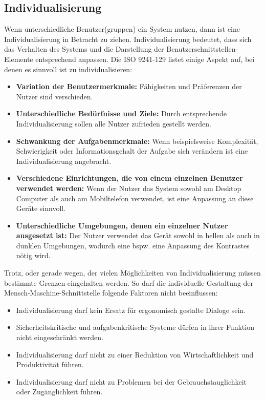 \subsection{Individualisierung}
\label{2:Individualisierung}
Wenn unterschiedliche Benutzer(gruppen) ein System nutzen, dann ist eine Individualisierung in Betracht zu ziehen. Individualisierung bedeutet, dass sich das Verhalten des Systems und die Darstellung der Benutzerschnittstellen-Elemente entsprechend anpassen. Die ISO 9241-129 \cite{ISO9241-129} listet einige Aspekt auf, bei denen es sinnvoll ist zu individualisieren:
\begin{itemize}
\item \textbf{Variation der Benutzermerkmale:} Fähigkeiten und Präferenzen der Nutzer sind verschieden.
\item \textbf{Unterschiedliche Bedürfnisse und Ziele:} Durch entsprechende Individualisierung sollen alle Nutzer zufrieden gestellt werden.
\item \textbf{Schwankung der Aufgabenmerkmale:} Wenn beispielsweise Komplexität, Schwierigkeit oder Informationsgehalt der Aufgabe sich verändern ist eine Individualisierung angebracht.
\item \textbf{Verschiedene Einrichtungen, die von einem einzelnen Benutzer verwendet werden:} Wenn der Nutzer das System sowohl am Desktop Computer als auch am Mobiltelefon verwendet, ist eine Anpassung an diese Geräte sinnvoll.
\item \textbf{Unterschiedliche Umgebungen, denen ein einzelner Nutzer ausgesetzt ist:} Der Nutzer verwendet das Gerät sowohl in hellen als auch in dunklen Umgebungen, wodurch eine bspw. eine Anpassung des Kontrastes nötig wird.
\end{itemize}
Trotz, oder gerade wegen, der vielen Möglichkeiten von Individualisierung müssen bestimmte Grenzen eingehalten werden. So darf die individuelle Gestaltung der Mensch-Maschine-Schnittstelle folgende Faktoren nicht beeinflussen:
\begin{itemize}
\item Individualisierung darf kein Ersatz für ergonomisch gestalte Dialoge sein.
\item Sicherheitskritische und aufgabenkritische Systeme dürfen in ihrer Funktion nicht eingeschränkt werden.
\item Individualisierung darf nicht zu einer Reduktion von Wirtschaftlichkeit und Produktivität führen.
\item Individualisierung darf nicht zu Problemen bei der Gebrauchstauglichkeit oder Zugänglichkeit führen.
\end{itemize}

